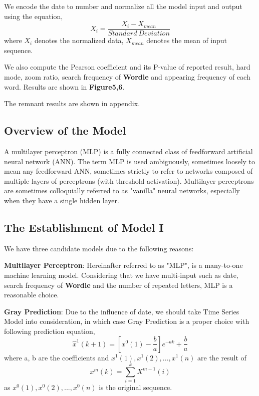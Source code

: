\documentclass[12pt]{article}
\begin{document}
We encode the date to number and normalize all the model input and output using the equation,
\begin{equation*}
	X_i = \frac{X_i - X_{mean}}{Standard\ Deviation}
\end{equation*}
where $X_i$ denotes the normalized data, $X_{mean}$ denotes the mean of input sequence.

We also compute the Pearson coefficient and its P-value of reported result, hard mode, zoom ratio, search frequency of \textbf{Wordle} and appearing frequency of each word. Results are shown in \textbf{Figure5,6}.

The remnant results are shown in appendix.






\subsection{Overview of the Model}
A multilayer perceptron (MLP) is a fully connected class of feedforward artificial neural network (ANN). The term MLP is used ambiguously, sometimes loosely to mean any feedforward ANN, sometimes strictly to refer to networks composed of multiple layers of perceptrons (with threshold activation). Multilayer perceptrons are sometimes colloquially referred to as "vanilla" neural networks, especially when they have a single hidden layer.

\subsection{The Establishment of Model I}
We have three candidate models due to the following reasons:

\textbf{Multilayer Perceptron}: Hereinafter referred to as "MLP", is a many-to-one machine learning model. Considering that we have multi-input such as date, search frequency of \textbf{Wordle} and the number of repeated letters, MLP is a reasonable choice.

\textbf{Gray Prediction}: Due to the influence of date, we should take Time Series Model into consideration, in which case Gray Prediction is a proper choice with following prediction equation,
\begin{equation*}
	\hat{x}^1(k+1) = [x^0(1)-\frac{b}{a}]e^{-ak} + \frac{b}{a}
\end{equation*}
where a, b are the coefficients and ${x^1(1),x^1(2),...,x^1(n)}$ are the result of 
\begin{equation*}
	x^m(k) = \sum_{i=1}^{k}X^{m-1}(i)
\end{equation*}
as ${x^0(1),x^0(2),...,x^0(n)}$ is the original sequence.
\end{document}
